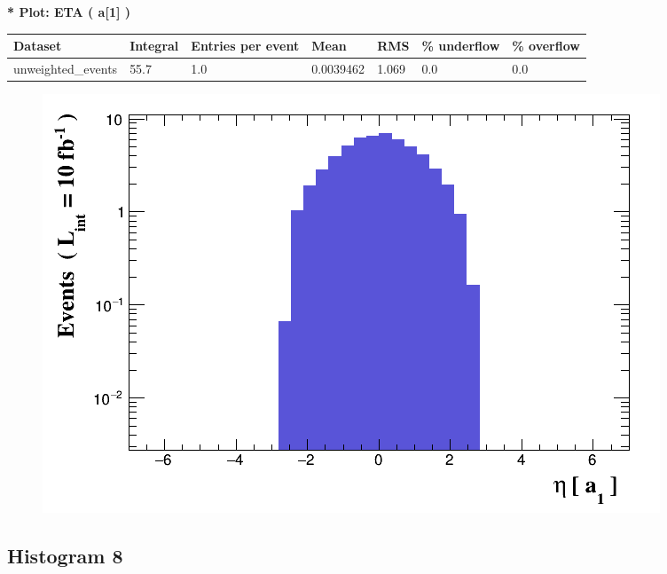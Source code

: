 \documentclass[a4paper, 10pt]{article}
\begin{document}
\textbf{* Plot: ETA ( a[1] ) }\\
   \begin{table}[H]
  \begin{center}
    \begin{tabular}{|m{23.0mm}|m{23.0mm}|m{18.0mm}|m{19.0mm}|m{19.0mm}|m{19.0mm}|m{19.0mm}|}
      \hline
      {\cellcolor{yellow}         Dataset}& {\cellcolor{yellow}         Integral}& {\cellcolor{yellow}         Entries per event}& {\cellcolor{yellow}         Mean}& {\cellcolor{yellow}         RMS}& {\cellcolor{yellow}         \% underflow}& {\cellcolor{yellow}         \% overflow}\\
      \hline
      {\cellcolor{white}         unweighted\_events}& {\cellcolor{white}         55.7}& {\cellcolor{white}         1.0}& {\cellcolor{white}         0.0039462}& {\cellcolor{white}         1.069}& {\cellcolor{green}         0.0}& {\cellcolor{green}         0.0}\\
\hline
    \end{tabular}
  \end{center}
\end{table}

\begin{figure}[H]
  \begin{center}
    \includegraphics[scale=0.45]{selection_6.png}\\
\caption{   }
  \end{center}
\end{figure}
      \newpage
\subsection{ Histogram 8}
\end{document}
